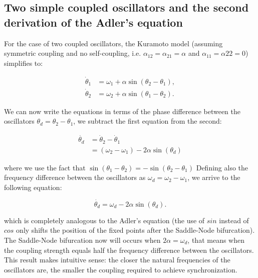 \documentclass{article}
\begin{document}
\subsection{Two simple coupled oscillators and the second derivation of the Adler's equation}

For the case of two coupled oscillators, the Kuramoto model (assuming symmetric coupling and no self-coupling, i.e. $\alpha_{12}=\alpha_{21}=\alpha$ and $\alpha_{11}=\alpha{22}=0$) simplifies to:

\begin{subequations} \label{eq_twocoupled}
\begin{align} 
    \dot{\theta}_1 &= \omega_1 + \alpha \sin(\theta_2 - \theta_1), \\
    \dot{\theta}_2 &= \omega_2 + \alpha \sin(\theta_1 - \theta_2).
\end{align}
\end{subequations}

We can now write the equations in terms of the phase difference between the oscillators $\theta_d = \theta_2 - \theta_1$, we subtract the first equation from the second:

\begin{subequations} \label{eq_twocoupledb}
\begin{align} 
    \dot{\theta_d} &= \dot{\theta}_2 - \dot{\theta}_1 \\
    &= (\omega_2 - \omega_1) - 2\alpha \sin(\theta_d)
\end{align}
\end{subequations}

where we use the fact that $\sin(\theta_1 - \theta_2) = - \sin(\theta_2 - \theta_1)$
Defining also the frequency difference between the oscillators as $\omega_d = \omega_2 - \omega_1$, we arrive to the following equation:

\begin{equation} \label{eq_phaselocking}
    \dot{\theta_d} = \omega_d - 2\alpha \sin(\theta_d).
\end{equation}

which is completely analogous to the Adler's equation (the use of $sin$ instead of $cos$ only shifts the position of the fixed points after the Saddle-Node bifurcation). The Saddle-Node bifurcation now will occurs when $2\alpha = \omega_d$, that means when the coupling strength equals half the frequency difference between the oscillators. 
This result makes intuitive sense: the closer the natural frequencies of the oscillators are, the smaller the coupling required to achieve synchronization.
\end{document}
